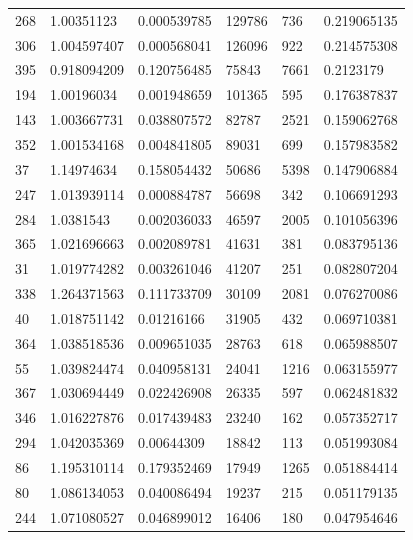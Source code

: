 \documentclass{cumcmthesis}
\begin{document}
\begin{longtable}{l|llll|l}
    268  & 1.00351123   & 0.000539785  & 129786   & 736            & 0.219065135    \\
    306  & 1.004597407  & 0.000568041  & 126096   & 922            & 0.214575308    \\
    395  & 0.918094209  & 0.120756485  & 75843    & 7661           & 0.2123179      \\
    194  & 1.00196034   & 0.001948659  & 101365   & 595            & 0.176387837    \\
    143  & 1.003667731  & 0.038807572  & 82787    & 2521           & 0.159062768    \\
    352  & 1.001534168  & 0.004841805  & 89031    & 699            & 0.157983582    \\
    37   & 1.14974634   & 0.158054432  & 50686    & 5398           & 0.147906884    \\
    247  & 1.013939114  & 0.000884787  & 56698    & 342            & 0.106691293    \\
    284  & 1.0381543    & 0.002036033  & 46597    & 2005           & 0.101056396    \\
    365  & 1.021696663  & 0.002089781  & 41631    & 381            & 0.083795136    \\
    31   & 1.019774282  & 0.003261046  & 41207    & 251            & 0.082807204    \\
    338  & 1.264371563  & 0.111733709  & 30109    & 2081           & 0.076270086    \\
    40   & 1.018751142  & 0.01216166   & 31905    & 432            & 0.069710381    \\
    364  & 1.038518536  & 0.009651035  & 28763    & 618            & 0.065988507    \\
    55   & 1.039824474  & 0.040958131  & 24041    & 1216           & 0.063155977    \\
    367  & 1.030694449  & 0.022426908  & 26335    & 597            & 0.062481832    \\
    346  & 1.016227876  & 0.017439483  & 23240    & 162            & 0.057352717    \\
    294  & 1.042035369  & 0.00644309   & 18842    & 113            & 0.051993084    \\
    86   & 1.195310114  & 0.179352469  & 17949    & 1265           & 0.051884414    \\
    80   & 1.086134053  & 0.040086494  & 19237    & 215            & 0.051179135    \\
    244  & 1.071080527  & 0.046899012  & 16406    & 180            & 0.047954646    \\

\end{longtable}
\end{document}

